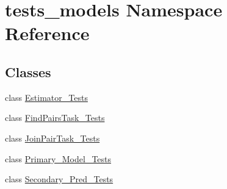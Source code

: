 \hypertarget{namespacetests__models}{}\section{tests\+\_\+models Namespace Reference}
\label{namespacetests__models}
\subsection*{Classes}
\begin{DoxyCompactItemize}
\item 
class \mbox{\hyperlink{classtests__models_1_1_estimator___tests}{Estimator\+\_\+\+Tests}}
\item 
class \mbox{\hyperlink{classtests__models_1_1_find_pairs_task___tests}{Find\+Pairs\+Task\+\_\+\+Tests}}
\item 
class \mbox{\hyperlink{classtests__models_1_1_join_pair_task___tests}{Join\+Pair\+Task\+\_\+\+Tests}}
\item 
class \mbox{\hyperlink{classtests__models_1_1_primary___model___tests}{Primary\+\_\+\+Model\+\_\+\+Tests}}
\item 
class \mbox{\hyperlink{classtests__models_1_1_secondary___pred___tests}{Secondary\+\_\+\+Pred\+\_\+\+Tests}}
\end{DoxyCompactItemize}
